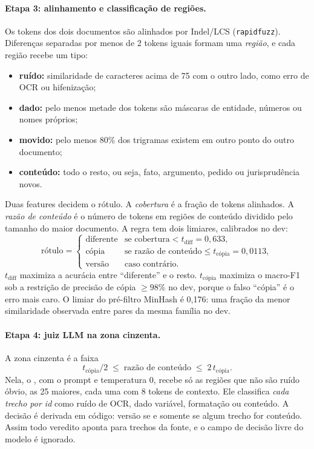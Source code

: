 \documentclass[11pt,a4paper]{article}
\newcommand{\cfg}[1]{\texttt{\detokenize{#1}}}
\begin{document}
\paragraph{Etapa 3: alinhamento e classificação de regiões.} Os tokens dos dois documentos são
alinhados por Indel/LCS (\texttt{rapidfuzz}). Diferenças separadas por menos de 2 tokens iguais
formam uma \emph{região}, e cada região recebe um tipo:
\begin{itemize}
  \item \textbf{ruído:} similaridade de caracteres acima de 75 com o outro lado, como erro de OCR
    ou hifenização;
  \item \textbf{dado:} pelo menos metade dos tokens são máscaras de entidade, números ou nomes
    próprios;
  \item \textbf{movido:} pelo menos 80\% dos trigramas existem em outro ponto do outro documento;
  \item \textbf{conteúdo:} todo o resto, ou seja, fato, argumento, pedido ou jurisprudência novos.
\end{itemize}
Duas features decidem o rótulo. A \emph{cobertura} é a fração de tokens alinhados. A \emph{razão
de conteúdo} é o número de tokens em regiões de conteúdo dividido pelo tamanho do maior documento.
A regra tem dois limiares, calibrados no dev:
\[
\text{rótulo} =
\begin{cases}
\text{diferente} & \text{se cobertura} < t_{\text{diff}} = 0{,}633,\\
\text{cópia} & \text{se razão de conteúdo} \le t_{\text{cópia}} = 0{,}0113,\\
\text{versão} & \text{caso contrário.}
\end{cases}
\]
$t_{\text{diff}}$ maximiza a acurácia entre ``diferente'' e o resto. $t_{\text{cópia}}$ maximiza
o macro-F1 sob a restrição de precisão de cópia $\ge 98\%$ no dev, porque o falso ``cópia'' é o
erro mais caro. O limiar do pré-filtro MinHash é 0,176: uma fração da menor similaridade
observada entre pares da mesma família no dev.

\paragraph{Etapa 4: juiz LLM na zona cinzenta.} A zona cinzenta é a faixa
\[ t_{\text{cópia}}/2 \;\le\; \text{razão de conteúdo} \;\le\; 2\,t_{\text{cópia}}. \]
Nela, o
\cfg{gpt-4.1-mini}, com o prompt \cfg{q1-judge-v1} e temperatura 0, recebe só as regiões que não
são ruído óbvio, as 25 maiores, cada uma com 8 tokens de contexto. Ele classifica \emph{cada
trecho por id} como ruído de OCR, dado variável, formatação ou conteúdo. A decisão é derivada em
código: versão se e somente se algum trecho for conteúdo. Assim todo veredito aponta para trechos
da fonte, e o campo de decisão livre do modelo é ignorado.
\end{document}
